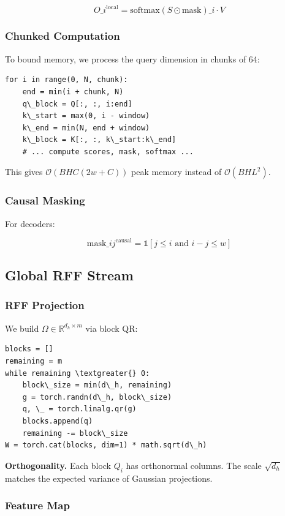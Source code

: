 \[
O\_i^\text{local} = \text{softmax}(S \odot \text{mask})\_i \cdot V
\tag{4.2}
\]

\subsubsection{Chunked Computation}

To bound memory, we process the query dimension in chunks of 64:

\begin{lstlisting}
for i in range(0, N, chunk):
    end = min(i + chunk, N)
    q\_block = Q[:, :, i:end]
    k\_start = max(0, i - window)
    k\_end = min(N, end + window)
    k\_block = K[:, :, k\_start:k\_end]
    # ... compute scores, mask, softmax ...
\end{lstlisting}

This gives $\mathcal{O}(B H C (2w + C))$ peak memory instead of 
$\mathcal{O}(B H L^2)$.

\subsubsection{Causal Masking}

For decoders:

\[
\text{mask}\_{ij}^\text{causal} = \mathbb{1}[j \leq i \text{ and } i - j \leq w]
\tag{4.3}
\]

\subsection{Global RFF Stream}

\subsubsection{RFF Projection}

We build $\Omega \in \mathbb{R}^{d_h \times m}$ via block QR:

\begin{lstlisting}
blocks = []
remaining = m
while remaining \textgreater{} 0:
    block\_size = min(d\_h, remaining)
    g = torch.randn(d\_h, block\_size)
    q, \_ = torch.linalg.qr(g)
    blocks.append(q)
    remaining -= block\_size
W = torch.cat(blocks, dim=1) * math.sqrt(d\_h)
\end{lstlisting}

\textbf{Orthogonality.} Each block $Q_i$ has orthonormal columns. The scale 
$\sqrt{d_h}$ matches the expected variance of Gaussian projections.

\subsubsection{Feature Map}

